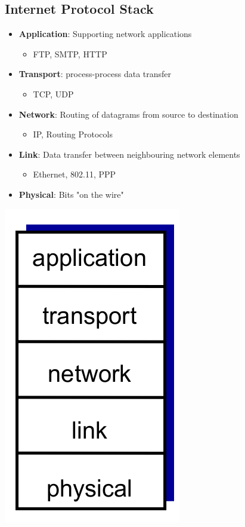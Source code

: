 \documentclass{article}[18pt]
\begin{document}
\subsection{Internet Protocol Stack}
\begin{minipage}{0.7\textwidth}
\begin{itemize}
	\item \textbf{Application}: Supporting network applications
	\begin{itemize}
		\item FTP, SMTP, HTTP
	\end{itemize}
	\item \textbf{Transport}: process-process data transfer
	\begin{itemize}
		\item TCP, UDP
	\end{itemize}
	\item \textbf{Network}: Routing of datagrams from source to destination
	\begin{itemize}
		\item IP, Routing Protocols
	\end{itemize}
	\item \textbf{Link}: Data transfer between neighbouring network elements
	\begin{itemize}
		\item Ethernet, 802.11, PPP
	\end{itemize}
	\item \textbf{Physical}: Bits "on the wire"
\end{itemize}
\end{minipage}
\begin{minipage}{0.3\textwidth}
\includegraphics[scale=0.5]{IP_Stack}
\end{minipage}
\end{document}
